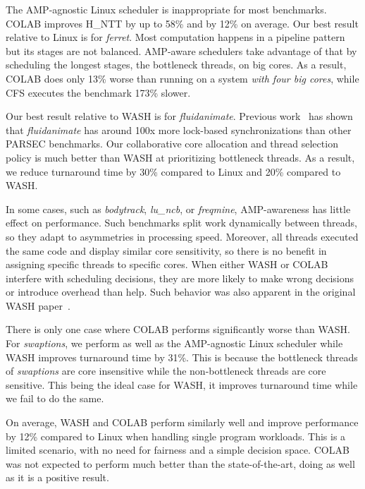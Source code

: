 The AMP-agnostic Linux scheduler is inappropriate for most benchmarks. COLAB improves H\_NTT by up to 58\% and by 12\% on average. Our best result relative to Linux is for \emph{ferret}. Most computation happens in a pipeline pattern but its stages are not balanced. AMP-aware schedulers take advantage of that by scheduling the longest stages, the bottleneck threads, on big cores. As a result, COLAB does only 13\% worse than running on a system \emph{with four big cores}, while CFS executes the benchmark 173\% slower.

Our best result relative to WASH is for \emph{fluidanimate}. Previous work~\cite{bienia08characterization} has shown that \emph{fluidanimate} has around 100x more lock-based synchronizations than other PARSEC benchmarks. Our collaborative core allocation and thread selection policy is much better than WASH at prioritizing bottleneck threads.  As a result, we reduce turnaround time by 30\% compared to Linux and 20\% compared to WASH.

In some cases, such as \emph{bodytrack}, \emph{lu\_ncb}, or \emph{freqmine}, AMP-awareness has little effect on performance. Such benchmarks split work dynamically between threads, so they adapt to asymmetries in processing speed. Moreover, all threads executed the same code and display similar core sensitivity, so there is no benefit in assigning specific threads to specific cores. When either WASH or COLAB interfere with scheduling decisions, they are more likely to make wrong decisions or introduce overhead than help. Such behavior was also apparent in the original WASH paper~\cite{jibaja2016portable}.

There is only one case where COLAB performs significantly worse than WASH. For \emph{swaptions}, we perform as well as the AMP-agnostic Linux scheduler while WASH improves turnaround time by 31\%. This is because the bottleneck threads of \emph{swaptions} are core insensitive while the non-bottleneck threads are core sensitive. This being the ideal case for WASH, it improves turnaround time while we fail to do the same.

On average, WASH and COLAB perform similarly well and improve performance by 12\% compared to Linux when handling single program workloads. This is a limited scenario, with no need for fairness and a simple decision space. COLAB was not expected to perform much better than the state-of-the-art, doing as well as it is a positive result.


